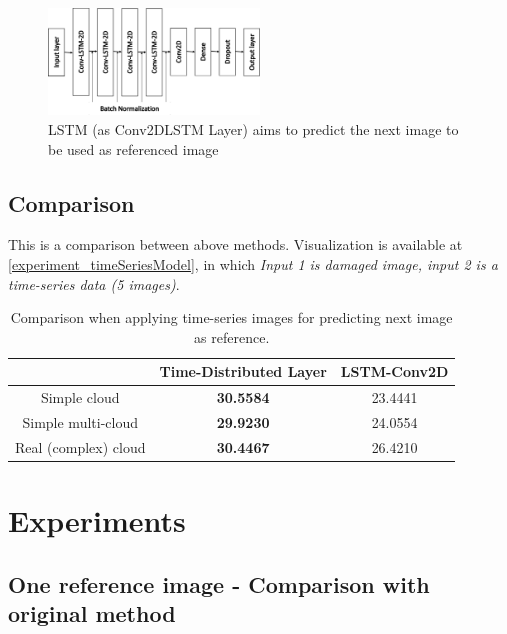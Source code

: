 \begin{figure}[h!]
	\centering
	\includegraphics[width=0.5\textwidth]{figures/modelConv2DLSTM_1.png}
	\caption{LSTM (as Conv2DLSTM Layer) aims to predict the next image to be used as referenced image}
	\label{fig:modelConv2DLSTM_1}
\end{figure}

\subsection{Comparison}

This is a comparison between above methods. Visualization is available at \ref{experiment_timeSeriesModel}, in which \textit{Input 1 is damaged image, input 2 is a time-series data (5 images)}. 

\begin{table}[h!]
	\centering
	\begin{tabularx}{\textwidth}{|c|c|c|}
		\hline
		& Time-Distributed Layer & LSTM-Conv2D \\ \hline
		Simple cloud         & \textbf{30.5584}                                                  & 23.4441     \\ \hline
		Simple multi-cloud   & \textbf{29.9230}                                                  & 24.0554     \\ \hline
		Real (complex) cloud & \textbf{30.4467}                                                  & 26.4210     \\ \hline
	\end{tabularx}
	\caption{Comparison when applying time-series images for predicting next image as reference.}
\end{table}

\section{Experiments}

\subsection{One reference image - Comparison with original method}\label{experiment_improvedModel}

